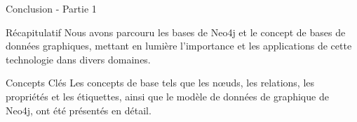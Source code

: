 \begin{frame}{Conclusion - Partie 1}
  \begin{block}{Récapitulatif}
    Nous avons parcouru les bases de Neo4j et le concept de bases de données graphiques, mettant en lumière l'importance et les applications de cette technologie dans divers domaines.
  \end{block}
  
  \begin{block}{Concepts Clés}
    Les concepts de base tels que les nœuds, les relations, les propriétés et les étiquettes, ainsi que le modèle de données de graphique de Neo4j, ont été présentés en détail.
  \end{block}
\end{frame}